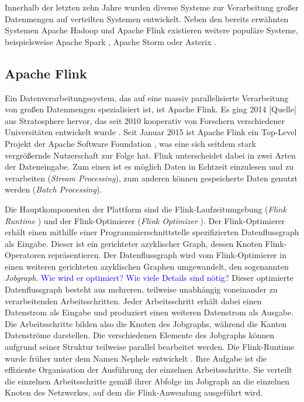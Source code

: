 Innerhalb der letzten zehn Jahre wurden diverse Systeme zur Verarbeitung großer Datenmengen auf verteilten Systemen entwickelt. Neben den bereits erwähnten Systemen Apache Hadoop und Apache Flink existieren weitere populäre Systeme, beispielsweise Apache Spark \cite{SparkWebsite}, Apache Storm \cite{StormWebsite} oder Asterix \cite{Alsubaiee2012}. 


\subsection{Apache Flink}
\label{sec:ApacheFlink}
Ein Datenverarbeitungssystem, das auf eine massiv parallelisierte Verarbeitung von großen Datenmengen spezialisiert ist, ist Apache Flink. Es ging 2014 [Quelle] aus Stratosphere hervor, das seit 2010 kooperativ von Forschern verschiedener Universitäten entwickelt wurde \cite{Battre2010, Alexandrov2014}. Seit Januar 2015 ist Apache Flink ein Top-Level Projekt der Apache Software Foundation \cite{ApacheFlinkBlogEntry}, was eine sich seitdem stark vergrößernde Nutzerschaft zur Folge hat. Flink unterscheidet dabei in zwei Arten der Dateneingabe. Zum einen ist es möglich Daten in Echtzeit einzulesen und zu verarbeiten (\textit{Stream Processing}), zum anderen können gespeicherte Daten genutzt werden (\textit{Batch Processing}). 

Die Hauptkomponenten der Plattform sind die Flink-Laufzeitumgebung (\textit{Flink Runtime} ) und der Flink-Optimierer (\textit{Flink Optimizer} ). Der Flink-Optimierer erhält einen mithilfe einer Programmierschnittstelle spezifizierten Datenflussgraph als Eingabe. Dieser ist ein gerichteter azyklischer Graph, dessen Knoten Flink-Operatoren repräsentieren. Der Datenflussgraph wird vom Flink-Optimierer in einen weiteren gerichteten azyklischen Graphen umgewandelt, den sogenannten \textit{Jobgraph}. \textcolor{blue}{Wie wird er optimiert? Wie viele Details sind nötig?}
Dieser optimierte Datenflussgraph besteht aus mehreren, teilweise unabhängig voneinander zu verarbeitenden Arbeitsschritten. Jeder Arbeitsschritt erhält dabei einen Datenstrom als Eingabe und produziert einen weiteren Datenstrom als Ausgabe. Die Arbeitsschritte bilden also die Knoten des Jobgraphs, während die Kanten Datenströme darstellen. Die verschiedenen Elemente des Jobgraphs können aufgrund seiner Struktur teilweise parallel bearbeitet werden. 
Die Flink-Runtime wurde früher unter dem Namen Nephele entwickelt \cite{Warneke2009}. Ihre Aufgabe ist die effiziente Organisation der Ausführung der einzelnen Arbeitsschritte. Sie verteilt die einzelnen Arbeitsschritte gemäß ihrer Abfolge im Jobgraph an die einzelnen Knoten des Netzwerkes, auf dem die Flink-Anwendung ausgeführt wird. 

